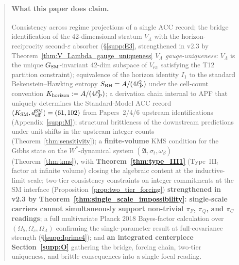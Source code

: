 \documentclass[11pt]{article}
\theoremstyle{plain}
\theoremstyle{definition}
\theoremstyle{remark}
\begin{document}
\begin{abstract}
\paragraph{What this paper does claim.}  Consistency across regime projections of a single ACC record; the bridge identification of the 42-dimensional stratum $V_\Lambda$ with the horizon-reciprocity second-$\varepsilon$ absorber (\S\ref{supp:E3}, strengthened in v2.3 by Theorem~\ref{thm:V_Lambda_gauge_uniqueness} \emph{$V_\Lambda$ gauge-uniqueness}: $V_\Lambda$ is the unique $G_{\rm SM}$-invariant 42-dim subspace of $V_{61}$ satisfying the T12 partition constraint); equivalence of the horizon identity $I_1$ to the standard Bekenstein--Hawking entropy $S_{\rm BH} = A/(4\ell_P^2)$ under the cell-count convention $K_{\rm horizon} := A/(4\ell_P^2)$; a derivation chain internal to APF that uniquely determines the Standard-Model ACC record $(K_{\rm SM}, d_{\rm eff}^{\rm SM}) = (61, 102)$ from Papers~2/4/6 upstream identifications (Appendix~\ref{supp:M}); structural brittleness of the downstream predictions under unit shifts in the upstream integer counts (Theorem~\ref{thm:sensitivity}); a \textbf{finite-volume} KMS condition for the Gibbs state on the $W^*$-dynamical system $(\mathfrak{A}, \sigma_t, \omega_\beta)$ (Theorem~\ref{thm:kms}), with \textbf{Theorem~\ref{thm:type_III1}} (Type~III$_1$ factor at infinite volume) closing the algebraic content at the inductive-limit scale; two-tier consistency constraints on integer commitments at the SM interface (Proposition~\ref{prop:two_tier_forcing}) \textbf{strengthened in v2.3 by Theorem~\ref{thm:single_scale_impossibility}: single-scale carriers cannot simultaneously support non-trivial $\pi_F$, $\pi_Q$, and $\pi_C$ readings}; a full multivariate Planck 2018 Bayes-factor calculation over $(\Omega_b, \Omega_c, \Omega_\Lambda)$ confirming the single-parameter result at full-covariance strength (\S\ref{supp:Iprime4}); and \textbf{an integrated centerpiece Section~\ref{supp:O}} gathering the bridge, forcing chain, two-tier uniqueness, and brittle consequences into a single focal reading.


\end{abstract}
\end{document}

